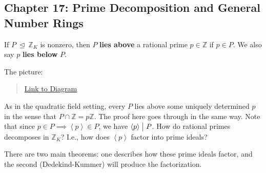 \hypertarget{chapter-17-prime-decomposition-and-general-number-rings}{%
\subsection{Chapter 17: Prime Decomposition and General Number
Rings}\label{chapter-17-prime-decomposition-and-general-number-rings}}

\begin{definition}

If \(P{~\trianglelefteq~}{\mathbb{Z}}_K\) is nonzero, then \(P\)
\textbf{lies above} a rational prime \(p\in {\mathbb{Z}}\) if
\(p\in P\). We also say \(p\) \textbf{lies below} \(P\).

The picture:

\begin{center}
\end{center}

\begin{quote}
\href{https://q.uiver.app/?q=WzAsNixbMCwwLCJLIl0sWzAsMiwiXFxRUSJdLFsyLDAsIlxcWlpfSyJdLFsyLDIsIlxcWloiXSxbNCwwLCJQIl0sWzQsMiwicCJdLFswLDEsIiIsMCx7InN0eWxlIjp7ImhlYWQiOnsibmFtZSI6Im5vbmUifX19XSxbMiwzLCIiLDAseyJzdHlsZSI6eyJoZWFkIjp7Im5hbWUiOiJub25lIn19fV0sWzQsNSwiIiwwLHsic3R5bGUiOnsiaGVhZCI6eyJuYW1lIjoibm9uZSJ9fX1dXQ==}{Link
to Diagram}
\end{quote}

\end{definition}

\begin{remark}

As in the quadratic field setting, every \(P\) lies above some uniquely
determined \(p\) in the sense that
\(P \cap{\mathbb{Z}}= p{\mathbb{Z}}\). The proof here goes through in
the same way. Note that since
\(p\in P \implies \left\langle{ p }\right\rangle \in P\), we have
\(\left\langle{ p }\right\rangle\bigm|P\). How do rational primes
decomposes in \({\mathbb{Z}}_K\)? I.e., how does
\(\left\langle{ p }\right\rangle\) factor into prime ideals?

\end{remark}

\begin{remark}

There are two main theorems: one describes how these prime ideals
factor, and the second (Dedekind-Kummer) will produce the factorization.

\end{remark}


